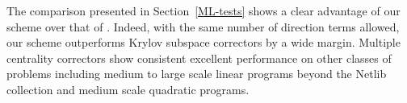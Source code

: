 The comparison presented in Section~\ref{ML-tests} shows a clear advantage 
of our scheme over that of \cite{MehrotraLi}. Indeed, with the same 
number of direction terms allowed, our scheme outperforms Krylov subspace 
correctors by a wide margin. Multiple centrality correctors show 
consistent excellent performance on other classes of problems
including medium to large scale linear programs beyond the Netlib 
collection and medium scale quadratic programs.

